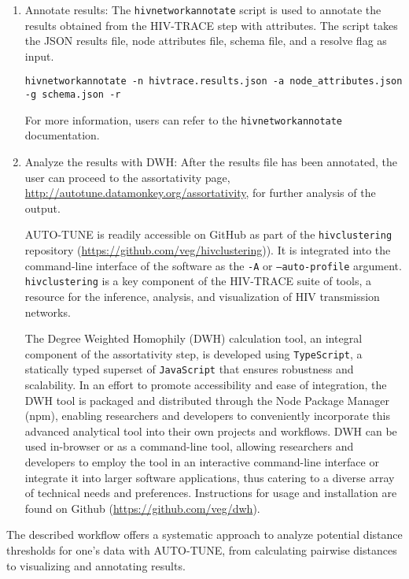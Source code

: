 \documentclass[utf8]{FrontiersinHarvard} %
\begin{document}
\begin{enumerate}
\item{ Annotate results: The {\tt hivnetworkannotate} script is used to annotate the results obtained from the HIV-TRACE step with attributes. The script takes the JSON results file, node attributes file, schema file, and a resolve flag as input.
	\begin{lstlisting}[style=BashInputStyle]
hivnetworkannotate -n hivtrace.results.json -a node_attributes.json -g schema.json -r
	\end{lstlisting}
 For more information, users can refer to the {\tt hivnetworkannotate} documentation.
}

\item{ Analyze the results with DWH: After the results file has been annotated, the user can proceed to the assortativity page, \url{http://autotune.datamonkey.org/assortativity}, for further analysis of the output. }

AUTO-TUNE is readily accessible on GitHub as part of the {\tt hivclustering} repository (\url{https://github.com/veg/hivclustering})). It is integrated into the command-line interface of the software as the {\tt -A} or {\tt --auto-profile} argument. {\tt hivclustering} is a key component of the HIV-TRACE suite of tools, a resource for the inference, analysis, and visualization of HIV transmission networks. 

The Degree Weighted Homophily (DWH) calculation tool, an integral component of the assortativity step, is developed using {\tt TypeScript}, a statically typed superset of {\tt JavaScript} that ensures robustness and scalability. In an effort to promote accessibility and ease of integration, the DWH tool is packaged and distributed through the Node Package Manager (npm), enabling researchers and developers to conveniently incorporate this advanced analytical tool into their own projects and workflows. DWH can be used in-browser or as a command-line tool, allowing researchers and developers to employ the tool in an interactive command-line interface or integrate it into larger software applications, thus catering to a diverse array of technical needs and preferences. Instructions for usage and installation are found on Github (\url{https://github.com/veg/dwh}).

\end{enumerate}

The described workflow offers a systematic approach to analyze potential distance thresholds for one's data with AUTO-TUNE, from calculating pairwise distances to visualizing and annotating results.
\end{document}
